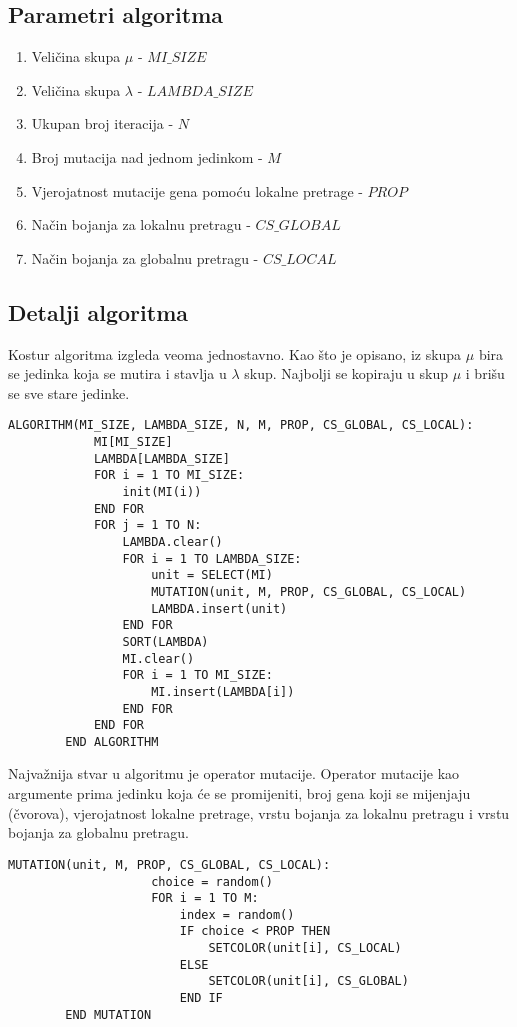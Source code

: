 \documentclass[times, utf8, diplomski, numeric]{fer}
\begin{document}
\subsection{Parametri algoritma}

\begin{enumerate}
	\item Veličina skupa $\mu$ - $MI\_SIZE$
	\item Veličina skupa $\lambda$ - $LAMBDA\_SIZE$
	\item Ukupan broj iteracija - $N$
	\item Broj mutacija nad jednom jedinkom - $M$
	\item Vjerojatnost mutacije gena pomoću lokalne pretrage - $PROP$
	\item Način bojanja za lokalnu pretragu - $CS\_GLOBAL$
	\item Način bojanja za globalnu pretragu - $CS\_LOCAL$
\end{enumerate}

\subsection{Detalji algoritma}

Kostur algoritma izgleda veoma jednostavno. Kao što je opisano, iz skupa $\mu$ bira se jedinka koja se mutira i stavlja u $\lambda$ skup. Najbolji se kopiraju u skup $\mu$ i brišu se sve stare jedinke. 

\begin{singlespace}
	\begin{lstlisting}[caption=Pseudok\^{o}d evolucijske strategije]
		ALGORITHM(MI_SIZE, LAMBDA_SIZE, N, M, PROP, CS_GLOBAL, CS_LOCAL):
			MI[MI_SIZE]
			LAMBDA[LAMBDA_SIZE]
			FOR i = 1 TO MI_SIZE:
				init(MI(i))
			END FOR
			FOR j = 1 TO N:
				LAMBDA.clear()
				FOR i = 1 TO LAMBDA_SIZE:
					unit = SELECT(MI)
					MUTATION(unit, M, PROP, CS_GLOBAL, CS_LOCAL)
					LAMBDA.insert(unit)
				END FOR
				SORT(LAMBDA)
				MI.clear()
				FOR i = 1 TO MI_SIZE:
					MI.insert(LAMBDA[i])
				END FOR
			END FOR
		END ALGORITHM
	\end{lstlisting}
\end{singlespace}

Najvažnija stvar u algoritmu je operator mutacije. Operator mutacije kao argumente prima jedinku koja će se promijeniti, broj gena koji se mijenjaju (čvorova), vjerojatnost lokalne pretrage, vrstu bojanja za lokalnu pretragu i vrstu bojanja za globalnu pretragu. 

\begin{singlespace}
	\begin{lstlisting}[caption=Pseudok\^{o}d mutacije evolucijske strategije]
		MUTATION(unit, M, PROP, CS_GLOBAL, CS_LOCAL):
					choice = random()
					FOR i = 1 TO M:
						index = random()
						IF choice < PROP THEN
							SETCOLOR(unit[i], CS_LOCAL)
						ELSE
							SETCOLOR(unit[i], CS_GLOBAL)
						END IF
		END MUTATION
	\end{lstlisting}
\end{singlespace}
\end{document}
